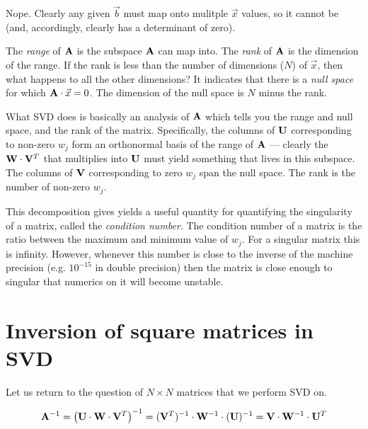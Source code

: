 
\begin{answer}
  Nope. Clearly any given $\vec{b}$ must map onto mulitple $\vec{x}$
  values, so it cannot be (and, accordingly, clearly has a determinant
  of zero).
\end{answer}

The {\it range} of ${\bf A}$ is the subspace ${\bf A}$ can map
into. The {\it rank} of ${\bf A}$ is the dimension of the range.  If
the rank is less than the number of dimensions ($N$) of $\vec{x}$,
then what happens to all the other dimensions? It indicates that there
is a {\it null space} for which $ {\bf A}\cdot \vec{x} = 0$. The
dimension of the null space is $N$ minus the rank.

What SVD does is basically an analysis of ${\bf A}$ which tells you
the range and null space, and the rank of the matrix. Specifically,
the columns of ${\bf U}$ corresponding to non-zero $w_j$ form an
orthonormal basis of the range of ${\bf A}$ --- clearly the ${\bf
W}\cdot{\bf V}^T$ that multiplies into ${\bf U}$ must yield something
that lives in this subspace. The columns of ${\bf V}$ corresponding to
zero $w_j$ span the null space.  The rank is the number of non-zero
$w_j$.

This decomposition gives yields a useful quantity for quantifying the
singularity of a matrix, called the {\it condition number}. The
condition number of a matrix is the ratio between the maximum and
minimum value of $w_j$. For a singular matrix this is
infinity. However, whenever this number is close to the inverse of the
machine precision (e.g. $10^{-15}$ in double precision) then the
matrix is close enough to singular that numerics on it will become
unstable. 

\section{Inversion of square matrices in SVD}

Let us return to the question of $N\times N$ matrices that we perform
SVD on.


\begin{answer}
\begin{equation}
{\bf A}^{-1}
= \left( {\bf U} \cdot {\bf W} \cdot {\bf V}^T\right)^{-1} 
= ({\bf V}^{T})^{-1} \cdot {\bf W}^{-1} \cdot ({\bf U})^{-1} 
= {\bf V} \cdot {\bf W}^{-1} \cdot {\bf U}^{T} 
\end{equation}
\end{answer}

